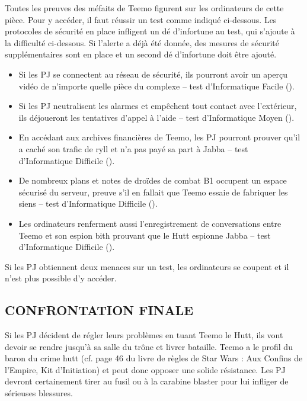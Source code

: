 \documentclass[a4paper,10pt,twoside,twocolumn,openany]{book}
\begin{document}
Toutes les preuves des méfaits de Teemo figurent
sur les ordinateurs de cette pièce. Pour y accéder, il
faut réussir un test comme indiqué ci-dessous. Les
protocoles de sécurité en place infligent un dé d’infortune \setback au test, qui s’ajoute à la difficulté ci-dessous. Si l’alerte a déjà été donnée, des mesures de sécurité
supplémentaires sont en place et un second dé d’infortune \setback doit être ajouté.

\begin{itemize}
    \item Si les PJ se connectent au réseau de sécurité,
ils pourront avoir un aperçu vidéo de n’importe
quelle pièce du complexe – test d’Informatique
Facile (\difficulty).

    \item  Si les PJ neutralisent les alarmes et empêchent
tout contact avec l’extérieur, ils déjoueront les
tentatives d’appel à l’aide – test d’Informatique
Moyen (\difficulty \difficulty).

    \item  En accédant aux archives financières de Teemo, les
PJ pourront prouver qu’il a caché son trafic de ryll et
n’a pas payé sa part à Jabba – test d’Informatique
Difficile (\difficulty \difficulty \difficulty).

    \item  De nombreux plans et notes de droïdes de combat
B1 occupent un espace sécurisé du serveur, preuve
s’il en fallait que Teemo essaie de fabriquer les siens
– test d’Informatique Difficile (\difficulty \difficulty \difficulty).

    \item  Les ordinateurs renferment aussi l’enregistrement
de conversations entre Teemo et son espion bith
prouvant que le Hutt espionne Jabba – test d’Informatique Difficile (\difficulty \difficulty \difficulty).
\end{itemize}

Si les PJ obtiennent deux menaces \threat \threat sur un test,
les ordinateurs se coupent et il n’est plus possible d’y
accéder.

\subsection{CONFRONTATION FINALE}

Si les PJ décident de régler leurs problèmes en tuant
Teemo le Hutt, ils vont devoir se rendre jusqu’à sa salle
du trône et livrer bataille. Teemo a le profil du baron du
crime hutt (cf. page 46 du livre de règles de Star Wars :
Aux Confins de l’Empire, Kit d’Initiation) et peut donc
opposer une solide résistance. Les PJ devront certainement tirer au fusil ou à la carabine blaster pour lui infliger
de sérieuses blessures.
\end{document}
